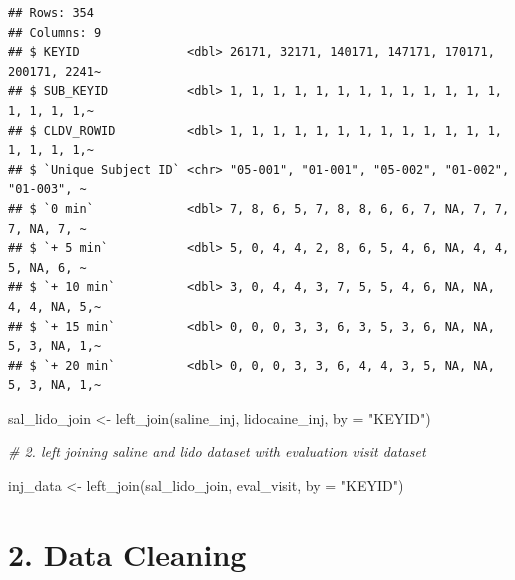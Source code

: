 \documentclass[
]{article}
\newenvironment{Shaded}{\begin{snugshade}}{\end{snugshade}}
\newcommand{\AttributeTok}[1]{\textcolor[rgb]{0.77,0.63,0.00}{#1}}
\newcommand{\CommentTok}[1]{\textcolor[rgb]{0.56,0.35,0.01}{\textit{#1}}}
\newcommand{\FunctionTok}[1]{\textcolor[rgb]{0.00,0.00,0.00}{#1}}
\newcommand{\NormalTok}[1]{#1}
\newcommand{\OtherTok}[1]{\textcolor[rgb]{0.56,0.35,0.01}{#1}}
\newcommand{\StringTok}[1]{\textcolor[rgb]{0.31,0.60,0.02}{#1}}
\begin{document}
\begin{verbatim}
## Rows: 354
## Columns: 9
## $ KEYID               <dbl> 26171, 32171, 140171, 147171, 170171, 200171, 2241~
## $ SUB_KEYID           <dbl> 1, 1, 1, 1, 1, 1, 1, 1, 1, 1, 1, 1, 1, 1, 1, 1, 1,~
## $ CLDV_ROWID          <dbl> 1, 1, 1, 1, 1, 1, 1, 1, 1, 1, 1, 1, 1, 1, 1, 1, 1,~
## $ `Unique Subject ID` <chr> "05-001", "01-001", "05-002", "01-002", "01-003", ~
## $ `0 min`             <dbl> 7, 8, 6, 5, 7, 8, 8, 6, 6, 7, NA, 7, 7, 7, NA, 7, ~
## $ `+ 5 min`           <dbl> 5, 0, 4, 4, 2, 8, 6, 5, 4, 6, NA, 4, 4, 5, NA, 6, ~
## $ `+ 10 min`          <dbl> 3, 0, 4, 4, 3, 7, 5, 5, 4, 6, NA, NA, 4, 4, NA, 5,~
## $ `+ 15 min`          <dbl> 0, 0, 0, 3, 3, 6, 3, 5, 3, 6, NA, NA, 5, 3, NA, 1,~
## $ `+ 20 min`          <dbl> 0, 0, 0, 3, 3, 6, 4, 4, 3, 5, NA, NA, 5, 3, NA, 1,~
\end{verbatim}

\begin{Shaded}
\begin{Highlighting}[]
\NormalTok{sal\_lido\_join }\OtherTok{\textless{}{-}} \FunctionTok{left\_join}\NormalTok{(saline\_inj, lidocaine\_inj, }\AttributeTok{by =} \StringTok{"KEYID"}\NormalTok{)}

\CommentTok{\# 2. left joining saline and lido dataset with evaluation visit dataset}

\NormalTok{inj\_data }\OtherTok{\textless{}{-}} \FunctionTok{left\_join}\NormalTok{(sal\_lido\_join, eval\_visit, }\AttributeTok{by =} \StringTok{"KEYID"}\NormalTok{) }
\end{Highlighting}
\end{Shaded}

\hypertarget{data-cleaning}{%
\section{2. Data Cleaning}\label{data-cleaning}}
\end{document}
